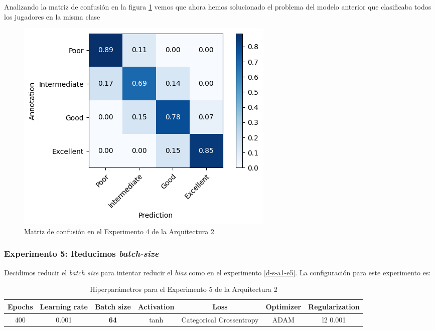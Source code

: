 \documentclass{article}
\begin{document}
			Analizando la matriz de confusi\'on en la figura \ref{d-cm-a2-e4} vemos que ahora hemos solucionado el problema del modelo anterior que clasificaba todos los jugadores en la misma clase
			\begin{figure}[!h]
				\begin{center}
					\includegraphics[scale=0.7]{d-cm-a2-e4.png}		
					\caption{Matriz de confusi\'on en el Experimento 4 de la Arquitectura 2}	
					\label{d-cm-a2-e4}
				\end{center}
			\end{figure}
			
		\subsubsection{Experimento 5: Reducimos \textit{batch-size}}
		\label{d-s-a2-e5}
			Decidimos reducir el \textit{batch size} para intentar reducir el \textit{bias} como en el experimento \ref{d-s-a1-e5}. La configuraci\'on para este experimento es:
			\begin{table}[!h]
				\begin{tabular}{| c | c | c | c | c | c | c |}
					\textbf{Epochs} & \textbf{Learning rate} & \textbf{Batch size} & \textbf{Activation} & \textbf{Loss} & \textbf{Optimizer} & \textbf{Regularization} \\ \hline
					400 & 0.001 & \textbf{64} & tanh & Categorical Crossentropy & ADAM & l2 0.001
				\end{tabular}
				\caption{Hiperpar\'ametros para el Experimento 5 de la Arquitectura 2}
				\label{tab:hip-d-a2-e5}
			\end{table}
			
\end{document}
